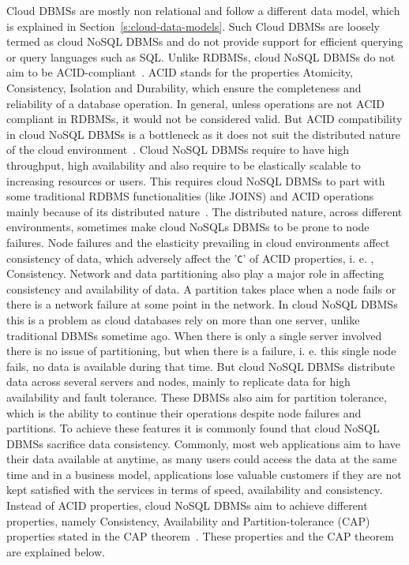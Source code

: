 Cloud \acp{DBMS} are mostly non relational and follow a different data model,
which is explained in Section~\ref{s:cloud-data-models}.  Such Cloud \acp{DBMS}
are loosely termed as cloud \ac{NoSQL} \acp{DBMS} and do not provide support for
efficient querying or query languages such as SQL. Unlike \acp{RDBMS}, cloud
\ac{NoSQL} \acp{DBMS} do not aim to be
ACID-compliant~\citep{Stonebraker,Stonebraker2,Florescu,Han}.
ACID stands for the properties Atomicity,   Consistency,   Isolation and
Durability, which ensure the completeness and reliability of a database
operation.  In general,   unless operations are not ACID compliant in
\acp{RDBMS},   it would not be considered valid. But ACID compatibility in cloud
\ac{NoSQL} \acp{DBMS} is a bottleneck as it does not suit the distributed nature
of the cloud environment~\citep{Wada,Stonebraker2}.
Cloud \ac{NoSQL} \acp{DBMS} require to have high throughput,   high availability
and also require to be elastically scalable to increasing resources or users.
This requires cloud \ac{NoSQL} \acp{DBMS} to part with some traditional
\ac{RDBMS} functionalities (like JOINS) and ACID operations mainly because of
its distributed nature~\citep{Wada}.  The distributed nature, across different
environments, sometimes make cloud \acp{NoSQL} \acp{DBMS} to be prone to node
failures.  Node failures and the elasticity prevailing in cloud environments
affect consistency of data,   which adversely affect the '\texttt{C}' of ACID
properties,   i. e. ,
  Consistency.  Network and data partitioning also play a major role in
affecting consistency and availability of data.   A partition takes place when a
node fails or there is a network failure at some point in the network.  In cloud
\ac{NoSQL} \acp{DBMS} this is a problem as cloud databases rely on more than one
server,   unlike traditional \acp{DBMS} sometime ago.  When there is only a
single server involved there is no issue of partitioning,   but when there is a
failure,   i. e.  this single node fails, no data is available during that time.
 But cloud \ac{NoSQL} \acp{DBMS} distribute data across several servers and
nodes,   mainly to replicate data for high availability and fault tolerance.
These \acp{DBMS} also aim for partition tolerance,   which is the ability to
continue their operations despite node failures and partitions.  To achieve
these features it is commonly found that cloud \ac{NoSQL} \acp{DBMS} sacrifice
data consistency.  Commonly,   most web applications aim to have their data
available at anytime,   as many users could access the data at the same time and
in a business model,   applications lose valuable customers if they are not kept
satisfied with the services in terms of speed,   availability and consistency.
Instead of ACID properties,   cloud \ac{NoSQL} \acp{DBMS} aim to achieve
different properties,   namely Consistency,   Availability and
Partition-tolerance (CAP) properties stated in the CAP
theorem~\citep{Wada,Ramakrishnan,Gilbert}.
These properties and the CAP theorem are explained below.

